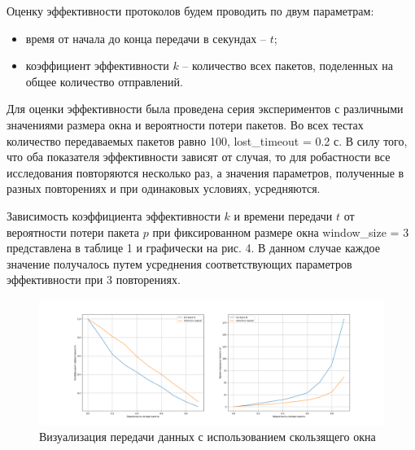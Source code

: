 Оценку эффективности протоколов будем проводить по двум
параметрам:

\begin{itemize}
	\item время от начала до конца передачи в секундах – $t$;
	\item коэффициент эффективности $k$ -- количество всех пакетов, поделенных на общее количество отправлений.
\end{itemize}

Для оценки эффективности была проведена серия экспериментов с
различными значениями размера окна и вероятности потери пакетов. Во всех
тестах количество передаваемых пакетов равно 100, lost\_timeout = 0.2 с. В силу того, что оба показателя эффективности зависят от случая, то для робастности все исследования повторяются несколько раз, а значения параметров, полученные в разных повторениях и при одинаковых условиях, усредняются. 

Зависимость коэффициента эффективности $k$ и времени передачи $t$ от
вероятности потери пакета $p$ при фиксированном размере окна
window\_size = 3 представлена в таблице 1 и графически на рис. 4. В данном случае каждое значение получалось путем усреднения соответствующих параметров эффективности при 3 повторениях.

\begin{figure}[H]
	\begin{center}
		\includegraphics[scale=0.35]{prob_test.png}
		\caption{Визуализация передачи данных с использованием скользящего окна}
	\end{center}
\end{figure}

